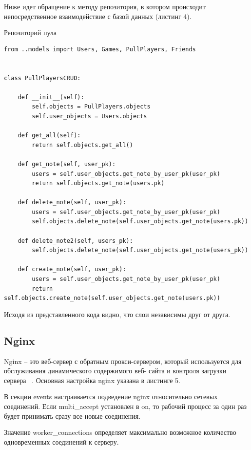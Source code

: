 \documentclass[a4paper,14pt]{extarticle}
\begin{document}
 	\newpage
 
 	Ниже идет обращение к методу репозитория, в котором происходит непосредственное взаимодействие с базой данных (листинг 4).
 	
 	\begin{listing}
 		\caption{Репозиторий пула}
 		\label{code:pull_rep}
 		\begin{verbatim}
from ..models import Users, Games, PullPlayers, Friends


class PullPlayersCRUD:

	def __init__(self):
		self.objects = PullPlayers.objects
		self.user_objects = Users.objects
	
	def get_all(self):
		return self.objects.get_all()
	
	def get_note(self, user_pk):
		users = self.user_objects.get_note_by_user_pk(user_pk)
		return self.objects.get_note(users.pk)
	
	def delete_note(self, user_pk):
		users = self.user_objects.get_note_by_user_pk(user_pk)
		self.objects.delete_note(self.user_objects.get_note(users.pk))
	
	def delete_note2(self, users_pk):
		self.objects.delete_note(self.user_objects.get_note(users_pk))
	
	def create_note(self, user_pk):
		users = self.user_objects.get_note_by_user_pk(user_pk)
		return self.objects.create_note(self.user_objects.get_note(users.pk))
 		\end{verbatim}
 	\end{listing}
 	
 
 	Исходя из представленного кода видно, что слои независимы друг от друга.
 	
 	\subsection{Nginx}
 	
 	Nginx – это веб-сервер с обратным прокси-сервером, который используется для обслуживания динамического содержимого веб- сайта и контроля загрузки сервера ~\cite{nginx}.
 	Основная настройка nginx указана в листинге 5.
 	
 	В секции events настраивается подведение nginx относительно сетевых соединений. Если multi\_accept установлен в on, то рабочий процесс за один раз будет принимать сразу все новые соединения.
 	
 	Значение worker\_connections определяет максимально возможное количество одновременных соединений к серверу.
 	
\end{document}
